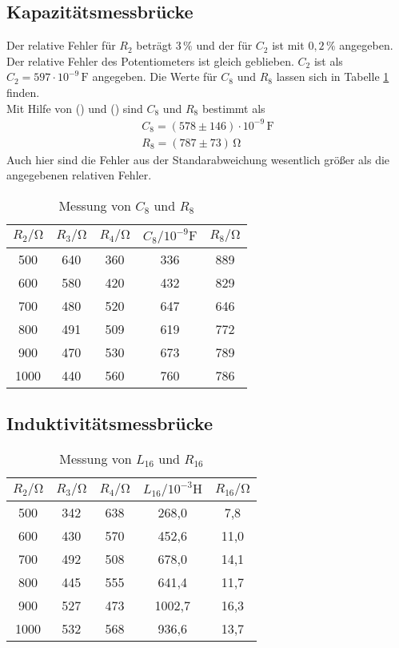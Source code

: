 \subsection{Kapazitätsmessbrücke}
Der relative Fehler für $R_2$ beträgt $3\,\%$ und der für $C_2$ ist mit $0,2 \,\%$ angegeben. Der relative Fehler des Potentiometers ist gleich geblieben.
$C_2$ ist als $C_2 = 597 \cdot 10^{-9}\,\unit{\farad}$ angegeben. Die Werte für $C_8$ und $R_8$ lassen sich in Tabelle \ref{tab:C8,R8} finden.\\
Mit Hilfe von () und () sind $C_8$ und $R_8$ bestimmt als
\begin{gather*}
  C_8 = (578 \pm 146)\cdot 10^{-9} \,\unit{\farad} \\
  R_8 = (787 \pm 73)\,\unit{\ohm}
\end{gather*}
Auch hier sind die Fehler aus der Standarabweichung wesentlich größer als die angegebenen relativen Fehler.

\begin{table}
  \centering
  \caption{Messung von $C_8$ und $R_8$}
  \label{tab:C8,R8}
  \begin{tabular}{c c c c c}
    \toprule
    $R_2/\unit{\ohm}$ & $R_3/\unit{\ohm}$ & $R_4/\unit{\ohm}$ & $C_8/10^{-9}\unit{\farad}$ & $R_8/\unit{\ohm}$ \\
    \midrule
     500 & 640 & 360 & 336 & 889 \\
     600 & 580 & 420 & 432 & 829 \\
     700 & 480 & 520 & 647 & 646 \\
     800 & 491 & 509 & 619 & 772 \\
     900 & 470 & 530 & 673 & 789 \\
    1000 & 440 & 560 & 760 & 786 \\
    \bottomrule
  \end{tabular}
\end{table}

\subsection{Induktivitätsmessbrücke}


\begin{table}
  \centering
  \caption{Messung von $L_{16}$ und $R_{16}$}
  \label{tab:Cx,Rx}
  \begin{tabular}{c c c c c}
    \toprule
    $R_2/\unit{\ohm}$ & $R_3/\unit{\ohm}$ & $R_4/\unit{\ohm}$ & $L_{16}/10^{-3}\unit{\henry}$ & $R_{16}/\unit{\ohm}$ \\
    \midrule
     500 & 342 & 638 &  268,0 &  7,8 \\
     600 & 430 & 570 &  452,6 & 11,0 \\
     700 & 492 & 508 &  678,0 & 14,1 \\
     800 & 445 & 555 &  641,4 & 11,7 \\
     900 & 527 & 473 & 1002,7 & 16,3 \\
    1000 & 532 & 568 &  936,6 & 13,7 \\
    \bottomrule
  \end{tabular}
\end{table}

